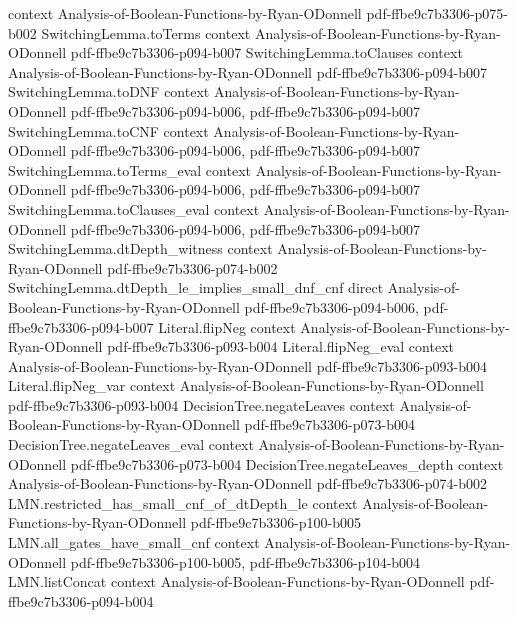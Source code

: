 \begin{lemma}
  {context}
  {Analysis-of-Boolean-Functions-by-Ryan-ODonnell}
  {pdf-ffbe9c7b3306-p075-b002}
\proofstep
  {SwitchingLemma.toTerms}
  {context}
  {Analysis-of-Boolean-Functions-by-Ryan-ODonnell}
  {pdf-ffbe9c7b3306-p094-b007}
\proofstep
  {SwitchingLemma.toClauses}
  {context}
  {Analysis-of-Boolean-Functions-by-Ryan-ODonnell}
  {pdf-ffbe9c7b3306-p094-b007}
\proofstep
  {SwitchingLemma.toDNF}
  {context}
  {Analysis-of-Boolean-Functions-by-Ryan-ODonnell}
  {pdf-ffbe9c7b3306-p094-b006,
    pdf-ffbe9c7b3306-p094-b007}
\proofstep
  {SwitchingLemma.toCNF}
  {context}
  {Analysis-of-Boolean-Functions-by-Ryan-ODonnell}
  {pdf-ffbe9c7b3306-p094-b006,
    pdf-ffbe9c7b3306-p094-b007}
\proofstep
  {SwitchingLemma.toTerms_eval}
  {context}
  {Analysis-of-Boolean-Functions-by-Ryan-ODonnell}
  {pdf-ffbe9c7b3306-p094-b006,
    pdf-ffbe9c7b3306-p094-b007}
\proofstep
  {SwitchingLemma.toClauses_eval}
  {context}
  {Analysis-of-Boolean-Functions-by-Ryan-ODonnell}
  {pdf-ffbe9c7b3306-p094-b006,
    pdf-ffbe9c7b3306-p094-b007}
\proofstep
  {SwitchingLemma.dtDepth_witness}
  {context}
  {Analysis-of-Boolean-Functions-by-Ryan-ODonnell}
  {pdf-ffbe9c7b3306-p074-b002}
\proofstep
  {SwitchingLemma.dtDepth_le_implies_small_dnf_cnf}
  {direct}
  {Analysis-of-Boolean-Functions-by-Ryan-ODonnell}
  {pdf-ffbe9c7b3306-p094-b006,
    pdf-ffbe9c7b3306-p094-b007}
\proofstep
  {Literal.flipNeg}
  {context}
  {Analysis-of-Boolean-Functions-by-Ryan-ODonnell}
  {pdf-ffbe9c7b3306-p093-b004}
\proofstep
  {Literal.flipNeg_eval}
  {context}
  {Analysis-of-Boolean-Functions-by-Ryan-ODonnell}
  {pdf-ffbe9c7b3306-p093-b004}
\proofstep
  {Literal.flipNeg_var}
  {context}
  {Analysis-of-Boolean-Functions-by-Ryan-ODonnell}
  {pdf-ffbe9c7b3306-p093-b004}
\proofstep
  {DecisionTree.negateLeaves}
  {context}
  {Analysis-of-Boolean-Functions-by-Ryan-ODonnell}
  {pdf-ffbe9c7b3306-p073-b004}
\proofstep
  {DecisionTree.negateLeaves_eval}
  {context}
  {Analysis-of-Boolean-Functions-by-Ryan-ODonnell}
  {pdf-ffbe9c7b3306-p073-b004}
\proofstep
  {DecisionTree.negateLeaves_depth}
  {context}
  {Analysis-of-Boolean-Functions-by-Ryan-ODonnell}
  {pdf-ffbe9c7b3306-p074-b002}
\proofstep
  {LMN.restricted_has_small_cnf_of_dtDepth_le}
  {context}
  {Analysis-of-Boolean-Functions-by-Ryan-ODonnell}
  {pdf-ffbe9c7b3306-p100-b005}
\proofstep
  {LMN.all_gates_have_small_cnf}
  {context}
  {Analysis-of-Boolean-Functions-by-Ryan-ODonnell}
  {pdf-ffbe9c7b3306-p100-b005,
    pdf-ffbe9c7b3306-p104-b004}
\proofstep
  {LMN.listConcat}
  {context}
  {Analysis-of-Boolean-Functions-by-Ryan-ODonnell}
  {pdf-ffbe9c7b3306-p094-b004}
\proofstep

\end{lemma}
